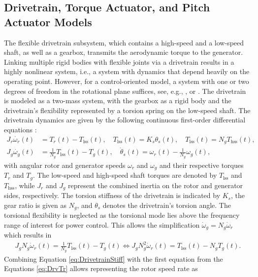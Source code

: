 \subsection{Drivetrain, Torque Actuator, and Pitch Actuator Models}\label{subsec:drivetrain, Torque Actuator, and Pitch Actuator Models}
The flexible drivetrain subsystem, which contains a high-speed and a low-speed shaft, as well as a gearbox, transmits the aerodynamic torque to the generator. Linking multiple rigid bodies with flexible joints via a drivetrain results in a highly nonlinear system, i.e., a system with dynamics that depend heavily on the operating point. However, for a control-oriented model, a system with one or two degrees of freedom in the rotational plane suffices, see, e.g., \cite{Bianchi2007}, \cite{peeters2006analysis} or  \cite{sharan2018actuator}.  
%
The drivetrain is modeled as a two-mass system, with the gearbox as a rigid body and the drivetrain's flexibility represented by a torsion spring on the low-speed shaft. The drivetrain dynamics are given by the following continuous first-order differential equations  \cite{sharan2018actuator}:
\begin{align} 
    J_{r}\dot{\omega_{r}}(t) &= T_{r}(t) - T_{\text{lss}}(t), \quad T_{\text{lss}}(t) = K_{s}\theta_{s}(t), \quad T_{\text{lss}}(t) = N_{g}T_{\text{hss}}(t), \nonumber\\
    J_{g}\dot{\omega_{g}}(t) &= \frac{1}{N_{g}} T_{\text{lss}}(t) - T_{g}(t), \quad \dot{\theta}_{s}(t) = \omega_{r}(t) - \frac{1}{N_{g}} \omega_{g}(t), \label{eq:DrvTr}
\end{align}
with angular rotor and generator speeds $\omega_{r}$ and $\omega_{g}$ and their respective torques $T_{r}$ and $T_{g}$. The low-speed and high-speed shaft torques are denoted by $T_{\text{lss}}$ and $T_{\text{hss}}$, while $J_{r}$ and $J_{g}$ represent the combined inertia on the rotor and generator sides, respectively. The torsion stiffness of the drivetrain is indicated by $K_{s}$, the gear ratio is given as $N_{g}$, and $\theta_{s}$ denotes the drivetrain's torsion angle. The torsional flexibility is neglected as the torsional mode lies above the frequency range of interest for power control. This allows the simplification $\dot{\omega}_g = N_g \dot{\omega}_r$ which results in
\begin{align} \label{eq:DrivetrainStiff}
     J_{g}N_g \dot{\omega}_r(t) = \frac{1}{N_{g}} T_{\text{lss}}(t) - T_{g}(t) \iff J_{g}N^2_g \dot{\omega}_r(t) = T_{\text{lss}}(t) - N_gT_{g}(t).
\end{align}
Combining Equation \eqref{eq:DrivetrainStiff} with the first equation from the Equations \eqref{eq:DrvTr} allows representing the rotor speed rate as
